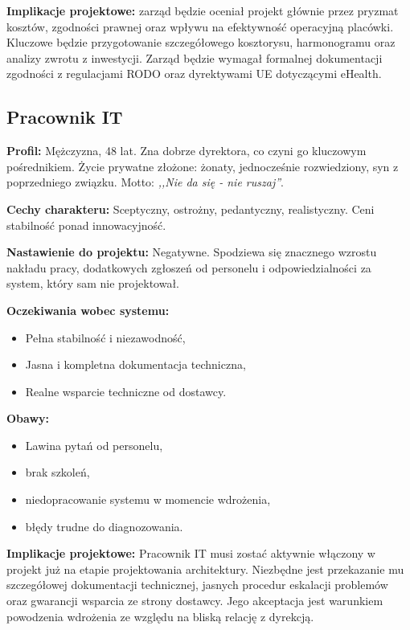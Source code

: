 \textbf{Implikacje projektowe:} zarząd będzie oceniał projekt głównie przez pryzmat kosztów, zgodności prawnej oraz wpływu na efektywność operacyjną placówki. Kluczowe będzie przygotowanie szczegółowego kosztorysu, harmonogramu oraz analizy zwrotu z inwestycji. Zarząd będzie wymagał formalnej dokumentacji zgodności z regulacjami RODO oraz dyrektywami UE dotyczącymi eHealth.

\subsection{Pracownik IT}

\textbf{Profil:} Mężczyzna, 48 lat. Zna dobrze dyrektora, co czyni go kluczowym pośrednikiem. Życie prywatne złożone: żonaty, jednocześnie rozwiedziony, syn z poprzedniego związku. Motto: \emph{,,Nie da się - nie ruszaj''}.

\textbf{Cechy charakteru:} Sceptyczny, ostrożny, pedantyczny, realistyczny. Ceni stabilność ponad innowacyjność.

\textbf{Nastawienie do projektu:} Negatywne. Spodziewa się znacznego wzrostu nakładu pracy, dodatkowych zgłoszeń od personelu i odpowiedzialności za system, który sam nie projektował.

\textbf{Oczekiwania wobec systemu:}
\begin{itemize}
    \item Pełna stabilność i niezawodność,
    \item Jasna i kompletna dokumentacja techniczna,
    \item Realne wsparcie techniczne od dostawcy.
\end{itemize}


\textbf{Obawy:} 
\begin{itemize}
    \item Lawina pytań od personelu,
    \item brak szkoleń,
    \item niedopracowanie systemu w momencie wdrożenia,
    \item błędy trudne do diagnozowania.
\end{itemize}

\textbf{Implikacje projektowe:} Pracownik IT musi zostać aktywnie włączony w projekt już na etapie projektowania architektury. Niezbędne jest przekazanie mu szczegółowej dokumentacji technicznej, jasnych procedur eskalacji problemów oraz gwarancji wsparcia ze strony dostawcy. Jego akceptacja jest warunkiem powodzenia wdrożenia ze względu na bliską relację z dyrekcją.

